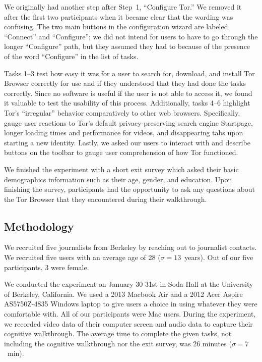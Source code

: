 \documentclass[letterpaper,twocolumn,11pt]{article}
\begin{document}
We originally had another step after Step~1, ``Configure Tor.''
We removed it after the first two participants
when it became clear that the wording was confusing.
The two main buttons in the configuration wizard are labeled
``Connect'' and ``Configure''; we did not intend for users
to have to go through the longer ``Configure'' path,
but they assumed they had to because of the presence
of the word ``Configure'' in the list of tasks.

Tasks 1--3 test how easy it was for a user to search for, download, and install Tor Browser 
correctly for use and if they understood that they had done the tasks correctly. 
Since no software is useful if the user is not able to access it, we found it valuable
to test the usability of this process.  Additionally, tasks 4--6 highlight Tor's ``irregular'' behavior 
comparatively to other web browsers. Specifically, gauge user reactions to Tor's default
privacy-preserving search engine Startpage,  longer loading times and performance for videos, 
and disappearing tabs upon starting a new identity. Lastly, we asked our users to 
interact with and describe buttons on the toolbar to gauge user comprehension of how Tor functioned.

We finished the experiment with a short exit survey which asked their basic demographics information 
such as their age, gender, and education. Upon finishing the survey, participants had the opportunity to 
ask any questions about the Tor Browser that they encountered during their walkthrough. 

\subsection{Methodology} 
\indent \indent We recruited five journalists from Berkeley by reaching out to journalist contacts.
 We recruited five users with an average age of 28 ($\sigma = 13 $~years). Out of 
our five participants, 3 were female. 

We conducted the experiment on January 30-31st in Soda 
Hall at the University of Berkeley, California. We used a 2013 Macbook Air and a 
2012 Acer Aspire AS5750Z-4835 Windows laptop to give users a choice in using whatever they were comfortable with. 
All of our participants were Mac users. During the experiment, 
we recorded video data of their computer screen and audio data to capture their cognitive walkthrough. 
The average time to complete the given tasks, not including the cognitive
walkthrough nor the exit survey, was 26 minutes ($\sigma = 7$~min). 
\end{document}
